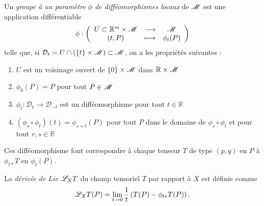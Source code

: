\documentclass[a4paper,11pt]{report}
\begin{document}
            \begin{defn}
                Un \textit{groupe à un paramètre $\phi$ de difféomorphismes locaux} de $\mathscr{M}$ est une application différentiable
                \begin{equation}
                \phi:\left(
                \begin{array}{ccc}
                    U\subset\mathbb{R}^m\times\mathscr{M} & \longrightarrow & \mathscr{M} \\
                    (t,P) & \longmapsto & \phi_t(P)
                \end{array}
                \right)
                \end{equation}
                telle que, si $\mathcal{D}_t=U\cap(\{t\}\times\mathscr{M})\subset\mathscr{M}$, on a les propriétés suivantes :
                \begin{enumerate}[label = \textit{\roman*)}]
                    \item $U$ est un voisinage ouvert de $\{0\}\times\mathscr{M}$ dans $\mathbb{R}\times\mathscr{M}$
                    \item $\phi_0(P)=P$ pour tout $P\in\mathscr{M}$
                    \item $\phi_t:\mathcal{D}_t\to\mathcal{D}_{-t}$ est un difféomorphisme pour tout $t\in\mathbb{R}$
                    \item $(\phi_s\circ\phi_t)(t) = \phi_{s+t}(P)$ pour tout $P$ dans le domaine de $\phi_s\circ\phi_t$ et pour tout $r,s\in\mathbb{R}$
                \end{enumerate}
            \end{defn}
            
            Ces difféomorphisme font correspondre à chaque tenseur $T$ de type $(p,q)$ en $P$ à $\phi_{t*}T$ en $\phi_t(P)$.
            
            \begin{defn}
                La \textit{dérivée de Lie} $\mathscr{L}_X T$ du champ tensoriel $T$ par rapport à $X$ est définie comme
                \begin{equation}
                    \mathscr{L}_X T (P) = \lim\limits_{t\to0} \frac{1}{t}\left(T(P)-\phi_{t*}T(P) \right).
                \end{equation}
            \end{defn}
            
\end{document}
